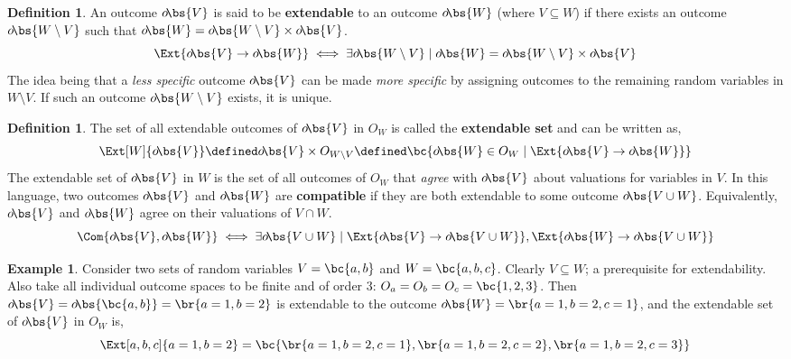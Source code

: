 \documentclass[aps, 10pt, english, twoside, pra, nofootinbib, longbibliography]{revtex4-1}
\theoremstyle{plain}
\theoremstyle{definition}
\newtheorem{definition}[theorem]{Definition}
\newtheorem{example}[theorem]{Example}
\theoremstyle{remark}
\newcommand{\term}[1]{\textcolor{Mahogany}{\textbf{#1}}}
\newcommand{\outc}[1]{o\!\bs{#1}}
\begin{document}
    \begin{definition}
        \label{def:extendable}
        An outcome $\outc{V}$ is said to be \term{extendable} to an outcome $\outc{W}$ (where $V \subseteq W$) if there exists an outcome $\outc{W\setminus V}$ such that $\outc{W} = \outc{W\setminus V} \times \outc{V}$.
        \[ \Ext{\outc{V} \to \outc{W}} \iff \exists \outc{W\setminus V} \mid \outc{W} = \outc{W\setminus V} \times \outc{V} \]
        The idea being that a \textit{less specific} outcome $\outc{V}$ can be made \textit{more specific} by assigning outcomes to the remaining random variables in $W \setminus V$. If such an outcome $\outc{W\setminus V}$ exists, it is unique.
    \end{definition}

    \begin{definition}
        The set of all extendable outcomes of $\outc{V}$ in $O_{W}$ is called the \term{extendable set} and can be written as,
        \[ \Ext[W]{\outc{V}} \defined \outc{V} \times O_{W\setminus V} \defined \bc{\outc{W} \in O_{W} \mid \Ext{\outc{V} \to \outc{W}}} \]
        The extendable set of $\outc{V}$ in $W$ is the set of all outcomes of $O_W$ that \textit{agree} with $\outc{V}$ about valuations for variables in $V$. In this language, two outcomes $\outc{V}$ and $\outc{W}$ are \term{compatible} if they are both extendable to some outcome $\outc{V \cup W}$. Equivalently, $\outc{V}$ and $\outc{W}$ agree on their valuations of $V \cap W$.
        \[ \Com{\outc{V}, \outc{W}} \iff \exists \outc{V \cup W} \mid \Ext{\outc{V} \to \outc{V \cup W}}, \Ext{\outc{W} \to \outc{V \cup W}} \]
    \end{definition}

    \begin{example}
        Consider two sets of random variables $V = \bc{a, b}$ and $W = \bc{a, b, c}$. Clearly $V \subseteq W$; a prerequisite for extendability. Also take all individual outcome spaces to be finite and of order 3: $O_a = O_b = O_c = \bc{1,2,3}$. Then $\outc{V} = \outc{\bc{a,b}} = \br{a = 1, b = 2}$ is extendable to the outcome $\outc{W} = \br{a = 1, b = 2, c = 1}$, and the extendable set of $\outc{V}$ in $O_{W}$ is,
        \[ \Ext[a,b,c]{a = 1, b = 2} = \bc{\br{a = 1, b = 2, c = 1}, \br{a = 1, b = 2, c = 2}, \br{a = 1, b = 2, c = 3}} \]
    \end{example}

\end{document}
